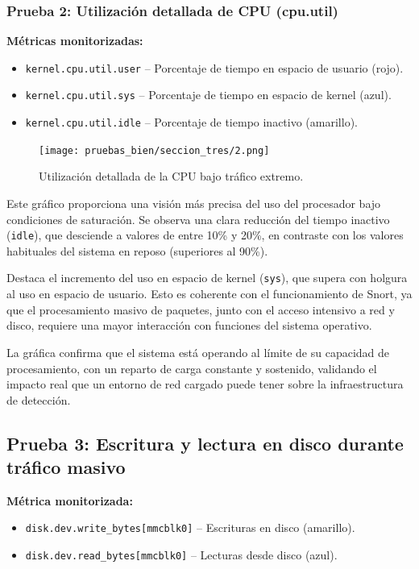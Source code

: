 \documentclass[11pt,a4paper,twoside]{report}
\begin{document}
\subsubsection*{Prueba 2: Utilización detallada de CPU (cpu.util)}

\textbf{Métricas monitorizadas:}
\begin{itemize}
	\item \texttt{kernel.cpu.util.user} – Porcentaje de tiempo en espacio de usuario (rojo).
	\item \texttt{kernel.cpu.util.sys} – Porcentaje de tiempo en espacio de kernel (azul).
	\item \texttt{kernel.cpu.util.idle} – Porcentaje de tiempo inactivo (amarillo).
\end{itemize}

\begin{figure}[H]
	\centering
	\texttt{[image: pruebas\_bien/seccion\_tres/2.png]}
	\caption{Utilización detallada de la CPU bajo tráfico extremo.}
\end{figure}

Este gráfico proporciona una visión más precisa del uso del procesador bajo condiciones de saturación. Se observa una clara reducción del tiempo inactivo (\texttt{idle}), que desciende a valores de entre 10\% y 20\%, en contraste con los valores habituales del sistema en reposo (superiores al 90\%).\newline

Destaca el incremento del uso en espacio de kernel (\texttt{sys}), que supera con holgura al uso en espacio de usuario. Esto es coherente con el funcionamiento de Snort, ya que el procesamiento masivo de paquetes, junto con el acceso intensivo a red y disco, requiere una mayor interacción con funciones del sistema operativo.\newline

La gráfica confirma que el sistema está operando al límite de su capacidad de procesamiento, con un reparto de carga constante y sostenido, validando el impacto real que un entorno de red cargado puede tener sobre la infraestructura de detección.

\subsection*{Prueba 3: Escritura y lectura en disco durante tráfico masivo}

\textbf{Métrica monitorizada:}
\begin{itemize}
	\item \texttt{disk.dev.write\_bytes[mmcblk0]} – Escrituras en disco (amarillo).
	\item \texttt{disk.dev.read\_bytes[mmcblk0]} – Lecturas desde disco (azul).
\end{itemize}
\end{document}
